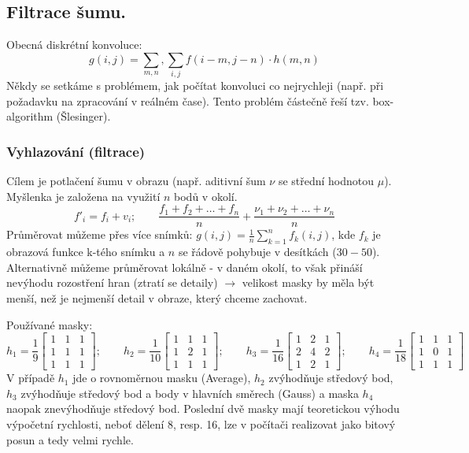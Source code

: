 \subsection{Filtrace šumu.}
Obecná diskrétní konvoluce:
\begin{equation}
g(i,j) = \displaystyle{\sum_{m,n}, \sum_{i,j}} f(i-m, j-n) \cdot h(m,n)
\end{equation}
Někdy se setkáme s problémem, jak počítat konvoluci co nejrychleji (např. při požadavku na zpracování v reálném čase). Tento problém částečně řeší tzv. box-algorithm (Šlesinger).

\subsubsection*{Vyhlazování (filtrace)}
Cílem je potlačení šumu v obrazu (např. aditivní šum $ \nu $ se střední hodnotou $ \mu $). Myšlenka je založena na využití $ n $ bodů v okolí.
\begin{equation}
f'_i = f_i + v_i; \qquad \frac{f_1 + f_2 + \dots + f_n}{n} + \frac{\nu_1 + \nu_2 + \dots + \nu_n}{n}
\end{equation}
Průměrovat můžeme přes více snímků: $ g(i,j) = \frac{1}{n} \displaystyle{\sum_{k=1}^n} f_k(i,j) $, kde $ f_k $ je obrazová funkce k-tého snímku a $ n $ se řádově pohybuje v desítkách ($ 30 - 50 $). Alternativně můžeme průměrovat lokálně - v daném okolí, to však přináší nevýhodu rozostření hran (ztratí se detaily) $ \to $ velikost masky by měla být menší, než je nejmenší detail v obraze, který chceme zachovat.

Používané masky:
\begin{equation*}
h_1 = \frac{1}{9} \begin{bmatrix}
1 & 1 & 1 \\ 1 & 1 & 1 \\ 1 & 1 & 1
\end{bmatrix}; \qquad h_2 = \frac{1}{10} \begin{bmatrix}
1 & 1 & 1 \\ 1 & 2 & 1 \\ 1 & 1 & 1
\end{bmatrix}; \qquad h_3 = \frac{1}{16} \begin{bmatrix}
1 & 2 & 1 \\ 2 & 4 & 2 \\ 1 & 2 & 1
\end{bmatrix}; \qquad h_4 = \frac{1}{18} \begin{bmatrix}
1 & 1 & 1 \\ 1 & 0 & 1 \\ 1 & 1 & 1
\end{bmatrix}
\end{equation*}
V případě $ h_1 $ jde o rovnoměrnou masku (Average), $ h_2 $ zvýhodňuje středový bod, $ h_3 $ zvýhodňuje středový bod a body v hlavních směrech (Gauss) a maska $ h_4 $ naopak znevýhodňuje středový bod. Poslední dvě masky mají teoretickou výhodu výpočetní rychlosti, neboť dělení 8, resp. 16, lze v počítači realizovat jako bitový posun a tedy velmi rychle.


